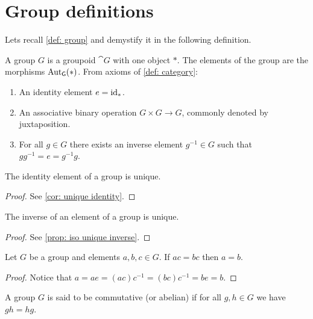 \section{Group definitions}

Lets recall \cref{def: group} and demystify it in the following definition.

\begin{definition}[Group]
  A group \(G\) is a groupoid \(\cat G\) with one object \(*\). The elements of
  the group are the morphisms \(\operatorname{Aut}_{\mathsf G}(*)\). From axioms of \cref{def:
  category}:
  \begin{enumerate}[(G1)]
    \item An identity element \(e = \operatorname{id}_*\).
    \item An associative binary operation \(G \times G \to G\), commonly denoted
      by juxtaposition.
    \item For all \(g \in G\) there exists an inverse element \(g^{-1} \in G\)
      such that \(g g^{-1} = e = g^{-1} g\).
  \end{enumerate}
\end{definition}

\begin{proposition}
  The identity element of a group is unique.
\end{proposition}

\begin{proof}
  See \cref{cor: unique identity}.
\end{proof}

\begin{proposition}
  The inverse of an element of a group is unique.
\end{proposition}

\begin{proof}
  See \cref{prop: iso unique inverse}.
\end{proof}

\begin{proposition}[Cancellation]
  Let \(G\) be a group and elements \(a, b, c \in G\). If \(a c = b c\) then
  \(a = b\).
\end{proposition}

\begin{proof}
  Notice that \(a = a e = (a c) c^{-1} = (b c) c^{-1} = b e = b\).
\end{proof}

\begin{definition}
  A group \(G\) is said to be commutative (or abelian) if for all \(g, h \in G\)
  we have \(g h = h g\).
\end{definition}

